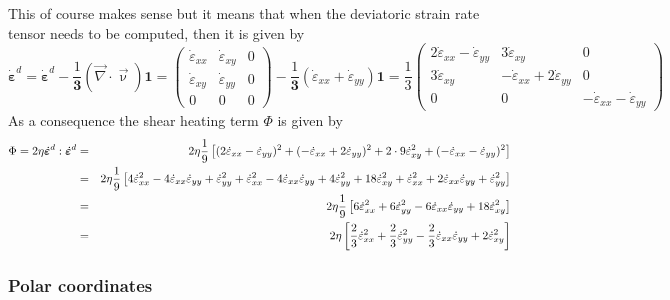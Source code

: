 This of course makes sense but it means that when the deviatoric strain rate tensor needs to be 
computed, then it is given by
\[
\dot{\bm \varepsilon}^d = \dot{\bm \varepsilon}^d - \frac{1}{\bm 3} (\vec\nabla\cdot\vec\upnu) {\bm 1}
=
\left(
\begin{array}{ccc}
\dot{\varepsilon}_{xx} & \dot{\varepsilon}_{xy} &  0 \\
\dot{\varepsilon}_{xy} & \dot{\varepsilon}_{yy} &  0 \\
0 &0 & 0
\end{array}
\right)
- \frac{1}{\bm 3} (\dot{\varepsilon}_{xx}+\dot{\varepsilon}_{yy}) {\bm 1}
=
\frac{1}{3}
\left(
\begin{array}{ccc}
2 \dot{\varepsilon}_{xx} - \dot{\varepsilon}_{yy} & 3\dot{\varepsilon}_{xy} &  0 \\
3\dot{\varepsilon}_{xy} & -\dot{\varepsilon}_{xx}+2 \dot{\varepsilon}_{yy} &  0 \\
0 &0 & -\dot{\varepsilon}_{xx}-\dot{\varepsilon}_{yy}
\end{array}
\right)
\]
As a consequence the shear heating term $\Phi$ is given by 
\begin{eqnarray}
\Phi = 2 \eta \dot{\bm \varepsilon}^d :\dot{\bm \varepsilon}^d 
&=& 2 \eta \frac19
\left[
(2\dot{\varepsilon}_{xx}-\dot{\varepsilon}_{yy})^2 +
(-\dot{\varepsilon}_{xx}+2\dot{\varepsilon}_{yy})^2 +
2\cdot 9\dot{\varepsilon}_{xy}^2
+( -\dot{\varepsilon}_{xx}-\dot{\varepsilon}_{yy})^2 \right] \nonumber\\
&=& 2\eta \frac19
\left[
4\dot{\varepsilon}_{xx}^2 - 4 \dot{\varepsilon}_{xx}\dot{\varepsilon}_{yy}
+\dot{\varepsilon}_{yy}^2
+ \dot{\varepsilon}_{xx}^2 - 4 \dot{\varepsilon}_{xx}\dot{\varepsilon}_{yy}
+ 4\dot{\varepsilon}_{yy}^2
+ 18 \dot{\varepsilon}_{xy}^2
+ \dot{\varepsilon}_{xx}^2 +2\dot{\varepsilon}_{xx}\dot{\varepsilon}_{yy}
+ \dot{\varepsilon}_{yy}^2 \right] \nonumber\\
&=& 2\eta \frac19
\left[ 6 \dot{\varepsilon}_{xx}^2 
+ 6 \dot{\varepsilon}_{yy}^2 
-6 \dot{\varepsilon}_{xx}\dot{\varepsilon}_{yy}
+ 18 \dot{\varepsilon}_{xy}^2 \right] \nonumber\\
&=& 2\eta \left[ \frac{2}{3} \dot{\varepsilon}_{xx}^2 
+ \frac23 \dot{\varepsilon}_{yy}^2 
-\frac23 \dot{\varepsilon}_{xx}\dot{\varepsilon}_{yy}
+ 2 \dot{\varepsilon}_{xy}^2 \right]
\end{eqnarray}


\subsubsection{Polar coordinates}

